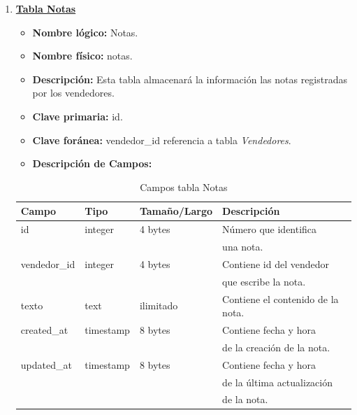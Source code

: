 \documentclass[letterpaper,12pt]{article}
\begin{document}
\begin{enumerate}
\begin{table}[!ht]
\begin{center}
\begin{tabular}{|l|l|l|l|}
\end{tabular}
\end{center}
\end{table}

\newpage

\item \textbf{\underline{Tabla Notas}}
\begin{itemize}
\item \textbf{Nombre lógico:} Notas.
\item \textbf{Nombre físico:} notas.
\item \textbf{Descripción:} Esta tabla almacenará la información las notas registradas por los vendedores.
\item \textbf{Clave primaria:} id.
\item \textbf{Clave foránea:} vendedor\_id referencia a tabla \emph{Vendedores}.
\item\textbf{Descripción de Campos:}
\end{itemize}

\begin{table}[!ht]
\caption{Campos tabla Notas}
\begin{center}
\begin{tabular}{|l|l|l|l|}
\hline
\textbf{Campo} \hspace*{2cm} & \textbf{Tipo} & \textbf{Tamaño/Largo} & \textbf{Descripción} \hspace*{3,5cm} \\
\hline
id & integer & 4 bytes&Número que identifica \\ 
\mbox{} & \mbox{} & &una nota.\\
\hline

vendedor\_id & integer & 4 bytes&Contiene id del vendedor\\
\mbox{} & \mbox{} & &que escribe la nota.\\
\hline

texto & text & ilimitado &Contiene el contenido de la nota.\\
\hline

created\_at& timestamp & 8 bytes &Contiene fecha y hora\\
\mbox{} & \mbox{} & &de la creación de la nota.\\
\hline
updated\_at& timestamp & 8 bytes &Contiene fecha y hora\\
\mbox{} & \mbox{} & &de la última actualización\\
\mbox{} & \mbox{} & &de la nota.\\
\hline

\end{tabular}
\end{center}
\end{table}

\end{enumerate}
\end{document}
